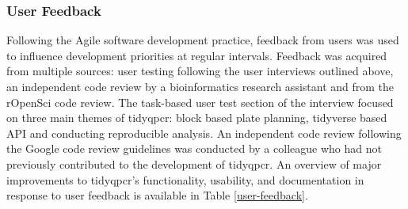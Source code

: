 \documentclass[../main.tex]{subfiles}
\begin{document}
\subsubsection{User Feedback}
Following the Agile software development practice, feedback from users was used to influence development priorities at regular intervals. 
Feedback was acquired from multiple sources: user testing following the user interviews outlined above, an independent code review by a bioinformatics research assistant and from the rOpenSci code review.
The task-based user test section of the interview focused on three main themes of tidyqpcr: block based plate planning, tidyverse based API and conducting reproducible analysis.
An independent code review following the Google code review guidelines was conducted by a colleague who had not previously contributed to the development of tidyqpcr.
An overview of major improvements to tidyqpcr's functionality, usability, and documentation in response to user feedback is available in Table \ref{user-feedback}.


\makeatletter
\renewcommand{\fnum@table}{Table \thetable}
\makeatother
\end{document}
